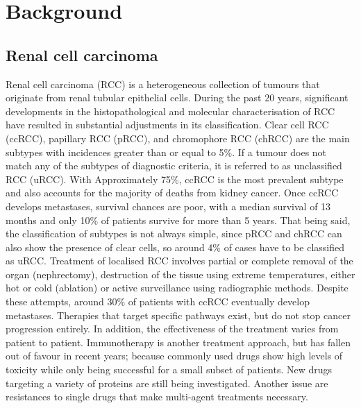 \chapter{Background}\label{Background}

\section{Renal cell carcinoma}

Renal cell carcinoma (RCC) is a heterogeneous collection of tumours that originate from renal tubular epithelial cells. During the past 20 years, significant developments in the histopathological and molecular characterisation of RCC have resulted in substantial adjustments in its classification. Clear cell RCC (ccRCC), papillary RCC (pRCC), and chromophore RCC (chRCC) are the main subtypes with incidences greater than or equal to 5\%. If a tumour does not match any of the subtypes of diagnostic criteria, it is referred to as unclassified RCC (uRCC). \cite{Hsieh2017Renal} 
With Approximately 75\%, ccRCC is the most prevalent subtype and also accounts for the majority of deaths from kidney cancer. \cite{Hsieh2017Renal} Once ccRCC develops metastases, survival chances are poor, with a median survival of 13 months and only 10\% of patients survive for more than 5 years. \cite{Cohen2005Renal}
That being said, the classification of subtypes is not always simple, since pRCC and chRCC can also show the presence of clear cells, so around 4\% of cases have to be classified as uRCC. \cite{Hsieh2017Renal, LopezBeltran20062004}
Treatment of localised RCC involves partial or complete removal of the organ (nephrectomy), destruction of the tissue using extreme temperatures, either hot or cold (ablation) or active surveillance using radiographic methods. Despite these attempts, around 30\% of patients with ccRCC eventually develop metastases. Therapies that target specific pathways exist, but do not stop cancer progression entirely. In addition, the effectiveness of the treatment varies from patient to patient. Immunotherapy is another treatment approach, but has fallen out of favour in recent years; because commonly used drugs show high levels of toxicity while only being successful for a small subset of patients. New drugs targeting a variety of proteins are still being investigated. Another issue are resistances to single drugs that make multi-agent treatments necessary. \cite{Hsieh2017Renal}

